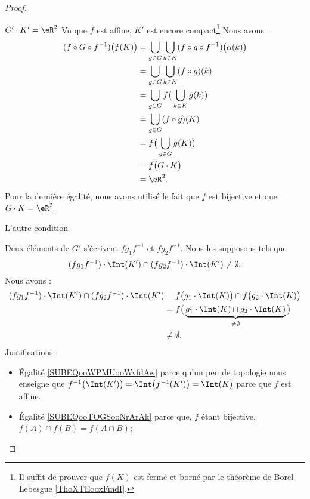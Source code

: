 \begin{proof}
\begin{subproof}
        \item[\( G'\cdot K'=\eR^2\)]
            Vu que \( f\) est affine, \( K'\) est encore compact\footnote{Il suffit de prouver que \( f(K)\) est fermé et borné par le théorème de Borel-Lebesgue \ref{ThoXTEooxFmdI}.} Nous avons :
            \begin{subequations}
                \begin{align}
                    (f\circ G\circ f^{-1})\big( f(K) \big)&=\bigcup_{g\in G}\bigcup_{k\in K}(f\circ g\circ f^{-1})\big( \alpha(k) \big)\\
                        &=\bigcup_{g\in G}\bigcup_{k\in K}(f\circ g)(k)\\
                        &=\bigcup_{g\in G}f\big( \bigcup_{k\in K}g(k) \big)\\
                        &=\bigcup_{g\in G}(f\circ g)(K)\\
                        &=f\big( \bigcup_{g\in G}g(K) \big)\\
                        &=f\big( G\cdot K \big)\\
                        &=\eR^2.
                \end{align}
            \end{subequations}
            Pour la dernière égalité, nous avons utilisé le fait que \( f\) est bijective et que \( G\cdot K=\eR^2\).
                
        \item[L'autre condition]

            Deux éléments de \( G'\) s'écrivent \( fg_1f^{-1}\) et \( fg_2f^{-1}\). Nous les supposons tels que
            \begin{equation}
                (fg_1f^{-1})\cdot \Int(K')\cap(f g_2 f^{-1})\cdot\Int(K')\neq \emptyset.
            \end{equation}
            Nous avons :
            \begin{subequations}
                \begin{align}
                    (fg_1f^{-1})\cdot \Int(K')\cap(f g_2 f^{-1})\cdot\Int(K')&=f\big( g_1\cdot\Int(K) \big)\cap f\big( g_2\cdot\Int(K) \big) \label{SUBEQooWPMUooWvfdAw}\\
                    &=f\big(  \underbrace{g_1\cdot\Int(K)\cap g_2\cdot\Int(K)}_{\neq \emptyset}  \big)        \label{SUBEQooTOGSooNrArAk}\\
                    &\neq \emptyset.
                \end{align}
            \end{subequations}
            Justifications :
            \begin{itemize}
                \item Égalité \eqref{SUBEQooWPMUooWvfdAw} parce qu'un peu de topologie nous enseigne que \( f^{-1}\big( \Int(K') \big)=  \Int\big( f^{-1}(K') \big)=\Int(K)  \) parce que \( f\) est affine.
                \item Égalité \eqref{SUBEQooTOGSooNrArAk} parce que, \( f\) étant bijective, \( f(A)\cap f(B)=f(A\cap B)\); 
            \end{itemize}


\end{subproof}
\end{proof}
